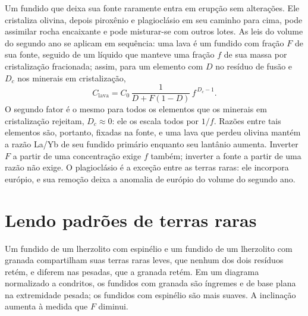 Um fundido que deixa sua fonte raramente entra em erupção sem alterações. Ele cristaliza
olivina, depois piroxênio e plagioclásio em seu caminho para cima, pode assimilar rocha
encaixante e pode misturar-se com outros lotes. As leis do volume do segundo ano se aplicam
em sequência: uma lava é um fundido com fração $F$ de sua fonte, seguido de um líquido que
manteve uma fração $f$ de sua massa por cristalização fracionada; assim,
para um elemento com $D$ no resíduo de fusão e $D_c$ nos
minerais em cristalização,
\[
C_{\text{lava}} = C_0\,\frac{1}{D + F(1 - D)}\,f^{\,D_c - 1}.
\]
O segundo fator é o mesmo para todos os elementos que os minerais em
cristalização rejeitam, $D_c \approx 0$: ele os escala todos por $1/f$. Razões entre tais
elementos são, portanto, fixadas na fonte, e uma lava que perdeu olivina
mantém a razão La/Yb de seu fundido primário enquanto seu lantânio aumenta. Inverter $F$
a partir de uma concentração exige $f$ também; inverter a fonte a partir de uma razão
não exige. O plagioclásio é a exceção entre as terras raras: ele incorpora európio,
e sua remoção deixa a anomalia de európio do volume do segundo ano.

\section{Lendo padrões de terras raras}\label{sec:b3:trace-element-modelling:patterns}

Um fundido de um lherzolito com espinélio e um fundido de um lherzolito com granada compartilham suas
terras raras leves, que nenhum dos dois resíduos retém, e diferem nas pesadas,
que a granada retém. Em um diagrama normalizado a condritos, os fundidos com granada são
íngremes e de base plana na extremidade pesada; os fundidos com espinélio são mais suaves. A
inclinação aumenta à medida que $F$ diminui.

